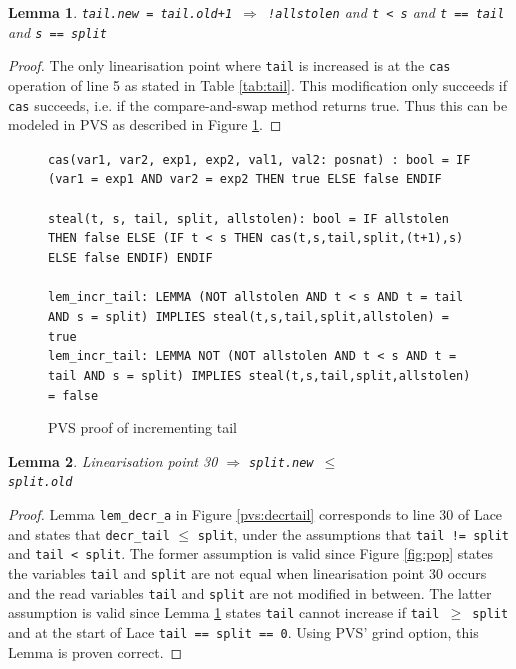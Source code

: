 \documentclass{sig-alternate-br}
\newtheorem{lemma}{Lemma}
\begin{document}
\begin{lemma}
	\texttt{tail.new = tail.old+1 $\Rightarrow$ !allstolen} and \texttt{t < s} and \texttt{t == tail} and \texttt{s == split}
	\label{lem:incrtail}
\end{lemma}
\begin{proof}
	The only linearisation point where \texttt{tail} is increased is at the \texttt{cas} operation of line 5 as stated in Table \ref{tab:tail}. This modification only succeeds if \texttt{cas} succeeds, i.e. if the compare-and-swap method returns true. Thus this can be modeled in PVS as described in Figure \ref{pvs:tailincr}.
\end{proof}
\begin{figure}[h]
	\texttt{cas(var1, var2, exp1, exp2, val1, val2: posnat) : bool = IF (var1 = exp1 AND var2 = exp2 THEN true ELSE false ENDIF}\\\\
	\texttt{steal(t, s, tail, split, allstolen): bool = IF allstolen THEN false ELSE (IF t < s THEN cas(t,s,tail,split,(t+1),s) ELSE false ENDIF) ENDIF}\\\\
	\texttt{lem\_incr\_tail: LEMMA (NOT allstolen AND t < s AND t = tail AND s = split) IMPLIES steal(t,s,tail,split,allstolen) = true}\\
	\texttt{lem\_incr\_tail: LEMMA NOT (NOT allstolen AND t < s AND t = tail AND s = split) IMPLIES steal(t,s,tail,split,allstolen) = false}
	\caption{PVS proof of incrementing tail}
	\label{pvs:tailincr}
\end{figure}

\begin{lemma}
	Linearisation point 30 $\Rightarrow$ \texttt{split.new $\leq$\\ split.old}
	\label{lem:lin30}
\end{lemma}
\begin{proof}
	Lemma \texttt{lem\_decr\_a} in Figure \ref{pvs:decrtail} corresponds to line 30 of Lace and states that \texttt{decr\_tail} $\leq$ \texttt{split}, under the assumptions that \texttt{tail != split} and \texttt{tail < split}.
	The former assumption is valid since Figure \ref{fig:pop} states the variables \texttt{tail} and \texttt{split} are not equal when linearisation point 30 occurs and the read variables \texttt{tail} and \texttt{split} are not modified in between.
	The latter assumption is valid since Lemma \ref{lem:incrtail} states \texttt{tail} cannot increase if \texttt{tail $\geq$ split} and at the start of Lace \texttt{tail == split == 0}.
	Using PVS' grind option, this Lemma is proven correct.
\end{proof}
\end{document}
